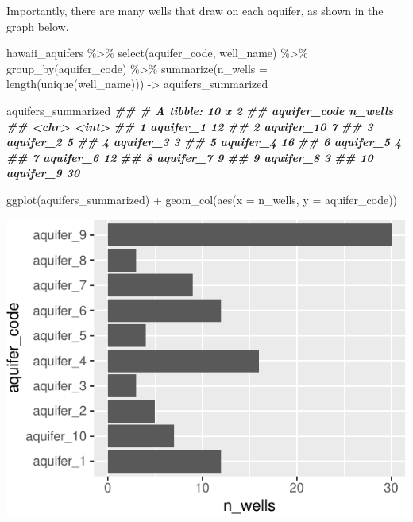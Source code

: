 \documentclass[
]{krantz}
\newenvironment{Shaded}{\begin{snugshade}}{\end{snugshade}}
\newcommand{\AttributeTok}[1]{\textcolor[rgb]{0.77,0.63,0.00}{#1}}
\newcommand{\DocumentationTok}[1]{\textcolor[rgb]{0.56,0.35,0.01}{\textbf{\textit{#1}}}}
\newcommand{\FunctionTok}[1]{\textcolor[rgb]{0.00,0.00,0.00}{#1}}
\newcommand{\NormalTok}[1]{#1}
\newcommand{\OtherTok}[1]{\textcolor[rgb]{0.56,0.35,0.01}{#1}}
\newcommand{\SpecialCharTok}[1]{\textcolor[rgb]{0.00,0.00,0.00}{#1}}
\begin{document}
Importantly, there are many wells that draw on each aquifer, as shown in the graph below.

\begin{Shaded}
\begin{Highlighting}[]
\NormalTok{hawaii\_aquifers }\SpecialCharTok{\%\textgreater{}\%}
  \FunctionTok{select}\NormalTok{(aquifer\_code, well\_name) }\SpecialCharTok{\%\textgreater{}\%}
  \FunctionTok{group\_by}\NormalTok{(aquifer\_code) }\SpecialCharTok{\%\textgreater{}\%}
  \FunctionTok{summarize}\NormalTok{(}\AttributeTok{n\_wells =} \FunctionTok{length}\NormalTok{(}\FunctionTok{unique}\NormalTok{(well\_name))) }\OtherTok{{-}\textgreater{}}\NormalTok{ aquifers\_summarized}

\NormalTok{aquifers\_summarized}
\DocumentationTok{\#\# \# A tibble: 10 x 2}
\DocumentationTok{\#\#    aquifer\_code n\_wells}
\DocumentationTok{\#\#    \textless{}chr\textgreater{}          \textless{}int\textgreater{}}
\DocumentationTok{\#\#  1 aquifer\_1         12}
\DocumentationTok{\#\#  2 aquifer\_10         7}
\DocumentationTok{\#\#  3 aquifer\_2          5}
\DocumentationTok{\#\#  4 aquifer\_3          3}
\DocumentationTok{\#\#  5 aquifer\_4         16}
\DocumentationTok{\#\#  6 aquifer\_5          4}
\DocumentationTok{\#\#  7 aquifer\_6         12}
\DocumentationTok{\#\#  8 aquifer\_7          9}
\DocumentationTok{\#\#  9 aquifer\_8          3}
\DocumentationTok{\#\# 10 aquifer\_9         30}

\FunctionTok{ggplot}\NormalTok{(aquifers\_summarized) }\SpecialCharTok{+} \FunctionTok{geom\_col}\NormalTok{(}\FunctionTok{aes}\NormalTok{(}\AttributeTok{x =}\NormalTok{ n\_wells, }\AttributeTok{y =}\NormalTok{ aquifer\_code))}
\end{Highlighting}
\end{Shaded}

\begin{center}\includegraphics{index_files/figure-latex/unnamed-chunk-133-1} \end{center}
\end{document}
